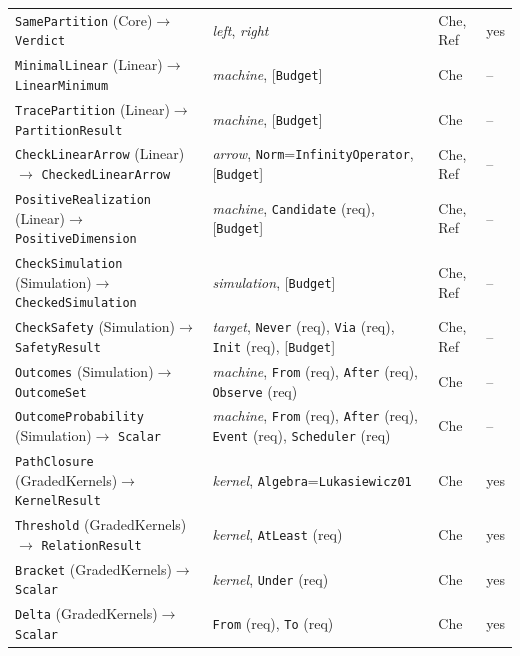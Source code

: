 \documentclass[11pt]{article}
\newcommand{\code}[1]{\texttt{#1}}
\theoremstyle{definition}
\theoremstyle{plain}
\begin{document}
{\begin{longtable}{>{\raggedright\arraybackslash}p{4.4cm}>{\raggedright\arraybackslash}p{6.8cm}>{\raggedright\arraybackslash}p{1.9cm}>{\raggedright\arraybackslash}p{0.5cm}}
\code{SamePartition} (Core)\newline$\to$ \code{Verdict} & \emph{left}, \emph{right} & Che, Ref & yes\\
\code{MinimalLinear} (Linear)\newline$\to$ \code{LinearMinimum} & \emph{machine}, [\code{Budget}] & Che & --\\
\code{TracePartition} (Linear)\newline$\to$ \code{PartitionResult} & \emph{machine}, [\code{Budget}] & Che & --\\
\code{CheckLinearArrow} (Linear)\newline$\to$ \code{CheckedLinearArrow} & \emph{arrow}, \code{Norm}=\code{InfinityOperator}, [\code{Budget}] & Che, Ref & --\\
\code{PositiveRealization} (Linear)\newline$\to$ \code{PositiveDimension} & \emph{machine}, \code{Candidate} (req), [\code{Budget}] & Che, Ref & --\\
\code{CheckSimulation} (Simulation)\newline$\to$ \code{CheckedSimulation} & \emph{simulation}, [\code{Budget}] & Che, Ref & --\\
\code{CheckSafety} (Simulation)\newline$\to$ \code{SafetyResult} & \emph{target}, \code{Never} (req), \code{Via} (req), \code{Init} (req), [\code{Budget}] & Che, Ref & --\\
\code{Outcomes} (Simulation)\newline$\to$ \code{OutcomeSet} & \emph{machine}, \code{From} (req), \code{After} (req), \code{Observe} (req) & Che & --\\
\code{OutcomeProbability} (Simulation)\newline$\to$ \code{Scalar} & \emph{machine}, \code{From} (req), \code{After} (req), \code{Event} (req), \code{Scheduler} (req) & Che & --\\
\code{PathClosure} (GradedKernels)\newline$\to$ \code{KernelResult} & \emph{kernel}, \code{Algebra}=\code{Lukasiewicz01} & Che & yes\\
\code{Threshold} (GradedKernels)\newline$\to$ \code{RelationResult} & \emph{kernel}, \code{AtLeast} (req) & Che & yes\\
\code{Bracket} (GradedKernels)\newline$\to$ \code{Scalar} & \emph{kernel}, \code{Under} (req) & Che & yes\\
\code{Delta} (GradedKernels)\newline$\to$ \code{Scalar} & \code{From} (req), \code{To} (req) & Che & yes\\

\end{longtable}}
\end{document}
